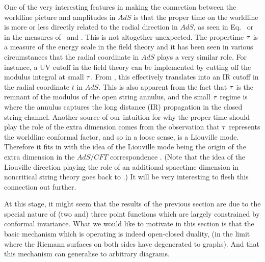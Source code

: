 One of the very interesting features in making the connection between the worldline picture and 
amplitudes in $AdS$ is that the proper time on the worldline is more or less directly related to
the radial direction in $AdS$, as seen in Eq. \proptime\ or in the measures of \posglue\ and  
\threetree . This is not altogether unexpected. The propertime ${\tau}$ is a measure
of the energy scale in the field theory and it has been seen in various circumstances
that the radial coordinate in $AdS$ plays a very similar role. For instance, a UV cutoff 
in the field theory can be implemented by cutting off the modulus integral at small ${\tau}$. From
\proptime , this effectively translates into an IR cutoff in the radial coordinate $t$ in $AdS$.
This is also apparent from the fact that 
${\tau}$ is the remnant of the modulus of the open string annulus, and 
the small ${\tau}$ regime is where the annulus captures the long 
distance (IR) propagation in the closed string channel. 
Another source of our intuition for why the 
proper time should play the role of the extra dimension comes from the observation that ${\tau}$
represents the worldline conformal factor, and so in a loose sense, is a Liouville mode. Therefore
it fits in with the idea of the Liouville mode being 
the origin of the extra dimension in the $AdS/CFT$ correspondence \polb\polc .
(Note that the idea of the Liouville direction playing the role of an additional spacetime dimension
in noncritical string theory goes back to \satchi\spenta\polchi .)  
It will be very interesting to flesh this connection out further.


At this stage, 
it might seem that the results of the previous section are due to the special nature of 
(two and) three point functions which are largely constrained by conformal invariance.  
What we would like to motivate in this section is that the basic mechanism which is operating 
is indeed open-closed duality, (in the limit where the Riemann surfaces on both sides 
have degenerated to graphs). And that this mechanism can generalise to arbitrary diagrams. 

